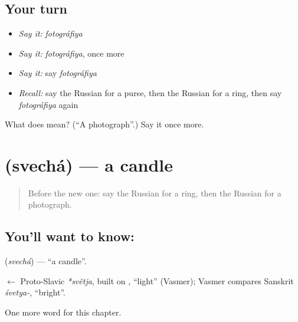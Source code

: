 \subsection*{Your turn}
\begin{itemize}
\raggedright
  \item \emph{Say it:} \emph{fotográfiya}
  \item \emph{Say it:} \emph{fotográfiya}, once more
  \item \emph{Say it:} say \emph{fotográfiya}
  \item \emph{Recall:} say the Russian for a purse, then the Russian for a ring, then say \emph{fotográfiya} again
\end{itemize}

\begin{tcolorbox}[breakable,colback=teal!4,colframe=teal!35!black,title={Before you move on}]
What does  mean? (\textquotedblleft{}A photograph\textquotedblright{}.) Say it once more.
\end{tcolorbox}
\section[\texorpdfstring{\ru{свеча} (svechá)}{свеча (svechá)}]{ (svechá) — a candle}

\label{lesson:RU-C100-candle}



\begin{quote}
Before the new one: say the Russian for a ring, then the Russian for a photograph.
\end{quote}

\subsection*{You'll want to know: }
\textbf{} (\emph{svechá}) — \textquotedblleft{}a candle\textquotedblright{}.

\begin{cousinweb}
\textbf{} $\leftarrow$ Proto-Slavic \emph{*světja}, built on \emph{}, \textquotedblleft{}light\textquotedblright{} (Vasmer); Vasmer compares Sanskrit \emph{śvetya-}, \textquotedblleft{}bright\textquotedblright{}.
\end{cousinweb}

\begin{grammarlens}[title={What you've built}]
One more word for this chapter.
\end{grammarlens}

